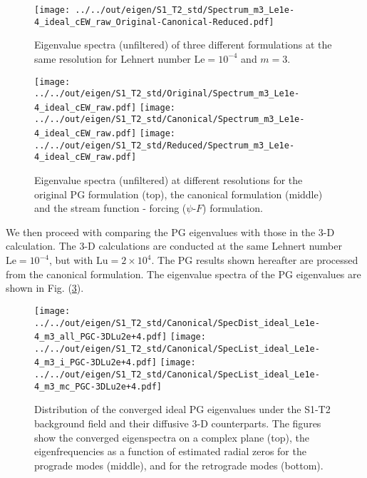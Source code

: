 \begin{figure}[ht]
    \centering
    \texttt{[image: ../../out/eigen/S1\_T2\_std/Spectrum\_m3\_Le1e-4\_ideal\_cEW\_raw\_Original-Canonical-Reduced.pdf]}
    \caption{Eigenvalue spectra (unfiltered) of three different formulations at the same resolution for Lehnert number $\mathrm{Le}=10^{-4}$ and $m=3$.}
    \label{fig:eigenspec-S1-T2-cstN}
\end{figure}
%
\begin{figure}[ht]
    \centering
    \texttt{[image: ../../out/eigen/S1\_T2\_std/Original/Spectrum\_m3\_Le1e-4\_ideal\_cEW\_raw.pdf]}
    \texttt{[image: ../../out/eigen/S1\_T2\_std/Canonical/Spectrum\_m3\_Le1e-4\_ideal\_cEW\_raw.pdf]}
    \texttt{[image: ../../out/eigen/S1\_T2\_std/Reduced/Spectrum\_m3\_Le1e-4\_ideal\_cEW\_raw.pdf]}
    \caption{Eigenvalue spectra (unfiltered) at different resolutions for the original PG formulation (top), the canonical formulation (middle) and the stream function - forcing ($\psi$-$F$) formulation.}
    \label{fig:eigenspec-S1-T2-varN}
\end{figure}

We then proceed with comparing the PG eigenvalues with those in the 3-D calculation. The 3-D calculations are conducted at the same Lehnert number $\mathrm{Le}=10^{-4}$, but with $\mathrm{Lu}=2\times 10^4$. The PG results shown hereafter are processed from the canonical formulation.
The eigenvalue spectra of the PG eigenvalues are shown in Fig. (\ref{fig:eigenspec-S1-T2-dist}).

\begin{figure}[ht]
    \centering
    \texttt{[image: ../../out/eigen/S1\_T2\_std/Canonical/SpecDist\_ideal\_Le1e-4\_m3\_all\_PGC-3DLu2e+4.pdf]}
    \texttt{[image: ../../out/eigen/S1\_T2\_std/Canonical/SpecList\_ideal\_Le1e-4\_m3\_i\_PGC-3DLu2e+4.pdf]}
    \texttt{[image: ../../out/eigen/S1\_T2\_std/Canonical/SpecList\_ideal\_Le1e-4\_m3\_mc\_PGC-3DLu2e+4.pdf]}
    \caption{Distribution of the converged ideal PG eigenvalues under the S1-T2 background field and their diffusive 3-D counterparts. The figures show the converged eigenspectra on a complex plane (top), the eigenfrequencies as a function of estimated radial zeros for the prograde modes (middle), and for the retrograde modes (bottom).}
    \label{fig:eigenspec-S1-T2-dist}
\end{figure}


